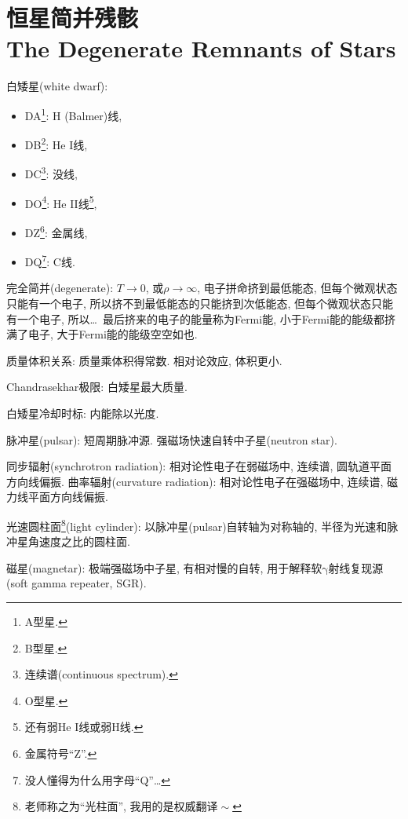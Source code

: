 \chapter{恒星简并残骸\\The Degenerate Remnants of Stars}

白矮星(white dwarf):
\begin{itemize}
    \item DA\footnote{A型星.}: H (Balmer)线,
    \item DB\footnote{B型星.}: He I线,
    \item DC\footnote{连续谱(continuous spectrum).}: 没线,
    \item DO\footnote{O型星.}: He II线\footnote{还有弱He I线或弱H线.},
    \item DZ\footnote{金属符号``Z''.}: 金属线,
    \item DQ\footnote{没人懂得为什么用字母``Q''\dots}: C线.
\end{itemize}

完全简并(degenerate): $T\to0$, 或$\rho\to\infty$, 电子拼命挤到最低能态, 但每个微观状态只能有一个电子, 所以挤不到最低能态的只能挤到次低能态, 但每个微观状态只能有一个电子, 所以\dots~最后挤来的电子的能量称为Fermi能, 小于Fermi能的能级都挤满了电子, 大于Fermi能的能级空空如也.

质量体积关系: 质量乘体积得常数. 相对论效应, 体积更小.

Chandrasekhar极限: 白矮星最大质量.

白矮星冷却时标: 内能除以光度.

脉冲星(pulsar): 短周期脉冲源. 强磁场快速自转中子星(neutron star).

同步辐射(synchrotron radiation): 相对论性电子在弱磁场中, 连续谱, 圆轨道平面方向线偏振. 曲率辐射(curvature radiation): 相对论性电子在强磁场中, 连续谱, 磁力线平面方向线偏振.

光速圆柱面\footnote{老师称之为``光柱面'', 我用的是权威翻译$\!\sim$}(light cylinder): 以脉冲星(pulsar)自转轴为对称轴的, 半径为光速和脉冲星角速度之比的圆柱面.

磁星(magnetar): 极端强磁场中子星, 有相对慢的自转, 用于解释软$\mathrm{\gamma}$射线复现源(soft gamma repeater, SGR).
